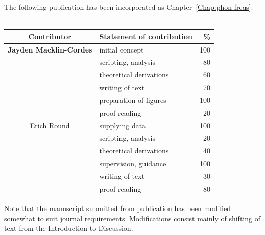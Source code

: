 \cleartoevenpage
\pagestyle{empty}	

\noindent
The following publication has been incorporated as Chapter~\ref{Chap:phon-freqs}:\\

\noindent
{}\\

\begin{table}[h]
	\centering
	\begin{tabular}{clr}
		\toprule
		Contributor & Statement of contribution & \% \\
		\midrule
		\textbf{Jayden Macklin-Cordes}	& initial concept			& 100 \\
		                                & scripting, analysis     	& 80  \\
		                                & theoretical derivations 	& 60  \\
		                                & writing of text 			& 70  \\
		                                & preparation of figures 	& 100 \\
										& proof-reading				& 20  \\
		\midrule
		Erich Round						& supplying data            & 100 \\
		                                & scripting, analysis       & 20  \\
		                                & theoretical derivations 	& 40  \\
		                                & supervision, guidance 	& 100 \\
		                                & writing of text 			& 30  \\
										& proof-reading				& 80  \\
		\bottomrule
	\end{tabular}
\end{table}

Note that the manuscript submitted from publication has been modified somewhat to suit journal requirements. Modifications consist mainly of shifting of text from the Introduction to Discussion.

